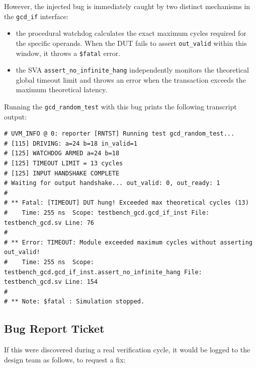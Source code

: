 However, the injected bug is immediately caught by two distinct mechanisms in the \texttt{gcd\_if} interface:
\begin{itemize}
    \item the procedural watchdog calculates the exact maximum cycles required for the specific operands. When the DUT fails to assert \texttt{out\_valid} within this window, it throws a \texttt{\$fatal} error.
    \item the SVA \texttt{assert\_no\_infinite\_hang} independently monitors the theoretical global timeout limit and throws an error when the transaction exceeds the maximum theoretical latency.
\end{itemize}

Running the \texttt{gcd\_random\_test} with this bug prints the following transcript output:
\newpage
\begin{verbatim}
# UVM_INFO @ 0: reporter [RNTST] Running test gcd_random_test...
# [115] DRIVING: a=24 b=18 in_valid=1
# [125] WATCHDOG ARMED a=24 b=18
# [125] TIMEOUT LIMIT = 13 cycles
# [125] INPUT HANDSHAKE COMPLETE
# Waiting for output handshake... out_valid: 0, out_ready: 1
# 
# ** Fatal: [TIMEOUT] DUT hung! Exceeded max theoretical cycles (13)
#    Time: 255 ns  Scope: testbench_gcd.gcd_if_inst File: testbench_gcd.sv Line: 76
#
# ** Error: TIMEOUT: Module exceeded maximum cycles without asserting out_valid!
#    Time: 255 ns  Scope: testbench_gcd.gcd_if_inst.assert_no_infinite_hang File: testbench_gcd.sv Line: 154
#
# ** Note: $fatal : Simulation stopped.
\end{verbatim}

\subsection{Bug Report Ticket}
If this were discovered during a real verification cycle, it would be logged to the design team as follows, to request a fix:


